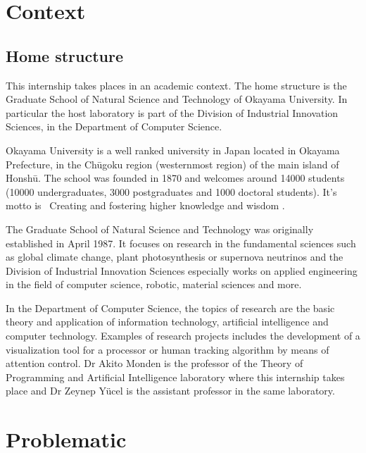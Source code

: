 \documentclass[12pt,a4paper,twoside]{article}
\begin{document}
\tableofcontents

\newpage

\section{Context}

\subsection{Home structure}
This internship takes places in an academic context. The home structure is the Graduate School of Natural Science and Technology of Okayama University. In particular the host laboratory is part of the Division of Industrial Innovation Sciences, in the Department of Computer Science.

Okayama University is a well ranked university in Japan located in Okayama Prefecture, in the Chūgoku region (westernmost region) of the main island of Honshū. The school was founded in 1870 and welcomes around 14000 students (10000 undergraduates, 3000 postgraduates and 1000 doctoral students). It's motto is \guillemotleft~Creating and fostering higher knowledge and wisdom \guillemotright.

The Graduate School of Natural Science and Technology was originally established in April 1987. It focuses on research in the fundamental sciences such as global climate change, plant photosynthesis or supernova neutrinos and the Division of Industrial Innovation Sciences especially works on applied engineering in the field of computer science, robotic, material sciences and more. 

In the Department of Computer Science, the topics of research are the basic theory and application of information technology, artificial intelligence and computer technology. Examples of research projects includes the development of a visualization tool for a processor or human tracking algorithm by means of attention control. Dr Akito Monden is the professor of the Theory of Programming and Artificial Intelligence laboratory where this internship takes place and Dr Zeynep Yücel is the assistant professor in the same laboratory. 

\section{Problematic}
\end{document}
